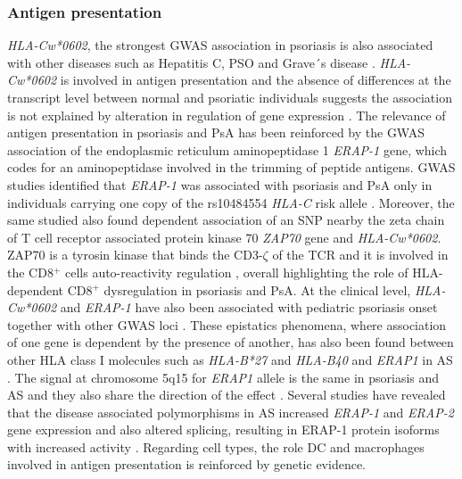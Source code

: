 \subsubsection*{Antigen presentation}
\textit{HLA-Cw*0602}, the strongest GWAS association in psoriasis is also associated with other diseases such as Hepatitis C, PSO and Grave´s disease \parencite{Blais2011}. \textit{HLA-Cw*0602} is involved in antigen presentation and the absence of differences at the transcript level between normal and psoriatic individuals suggests the association is not explained by alteration in regulation of gene expression \parencite{Hundhausen2012}. The relevance of antigen presentation in psoriasis and PsA has been reinforced by the GWAS association of the endoplasmic reticulum aminopeptidase 1 \textit{ERAP-1} gene, which codes for an aminopeptidase involved in the trimming of peptide antigens. GWAS studies identified that \textit{ERAP-1} was associated with psoriasis and PsA only in individuals carrying one copy of the rs10484554 \textit{HLA-C} risk allele \parencite{Strange2010}. Moreover, the same studied also found dependent association of an SNP nearby the zeta chain of T cell receptor associated protein kinase 70 \textit{ZAP70} gene and \textit{HLA-Cw*0602}. ZAP70 is a tyrosin kinase that binds the CD3-$\zeta$ of the TCR and it is involved in the CD8$^+$ cells auto-reactivity regulation \parencite{Picard2009}, overall highlighting the role of HLA-dependent CD8$^+$ dysregulation in psoriasis and PsA. At the clinical level, \textit{HLA-Cw*0602} and \textit{ERAP-1} have also been associated with pediatric psoriasis onset together with other GWAS loci \parencite{Bergboer2012}. These epistatics phenomena, where association of one gene is dependent by the presence of another, has also been found between other HLA class I molecules such as \textit{HLA-B*27} and \textit{HLA-B40} and \textit{ERAP1} in AS \parencite{Evans2011, Cortes2015b}. The signal at chromosome 5q15 for \textit{ERAP1} allele is the same in psoriasis and AS and they also share the direction of the effect \parencite{ImmunoBase}. Several studies have revealed that the disease associated polymorphisms in AS increased \textit{ERAP-1} and \textit{ERAP-2} gene expression and also altered splicing, resulting in ERAP-1 protein isoforms with increased activity \parencite{Constatino2015, Hanson2018}.
Regarding cell types, the role DC and macrophages involved in antigen presentation is reinforced by genetic evidence.

